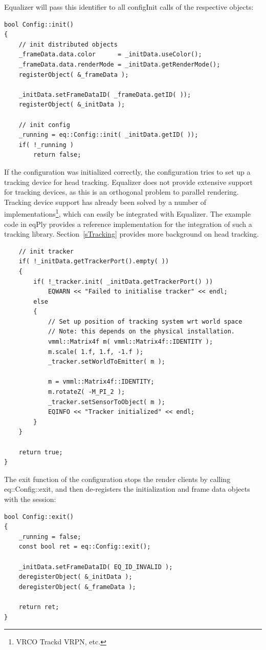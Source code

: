 \documentclass[10pt,a4]{scrartcl}
\newcommand{\sref}[1]{Section~\ref{#1}}
\begin{document}
Equalizer will pass this identifier to all \textsf{configInit} calls of
the respective objects:

{\footnotesize\begin{lstlisting}
bool Config::init()
{
    // init distributed objects
    _frameData.data.color      = _initData.useColor();
    _frameData.data.renderMode = _initData.getRenderMode();
    registerObject( &_frameData );

    _initData.setFrameDataID( _frameData.getID( ));
    registerObject( &_initData );

    // init config
    _running = eq::Config::init( _initData.getID( ));
    if( !_running )
        return false;
\end{lstlisting}}

If the configuration was initialized correctly, the configuration tries
to set up a tracking device for head tracking. Equalizer does not
provide extensive support for tracking devices, as this is an orthogonal
problem to parallel rendering. Tracking device support has already been
solved by a number of implementations\footnote{VRCO Trackd VRPN, etc.},
which can easily be integrated with Equalizer. The example code in
\textsf{eqPly} provides a reference implementation for the integration
of such a tracking library. \sref{sTracking} provides more background on
head tracking.

{\footnotesize\begin{lstlisting}
    // init tracker
    if( !_initData.getTrackerPort().empty( ))
    {
        if( !_tracker.init( _initData.getTrackerPort() ))
            EQWARN << "Failed to initialise tracker" << endl;
        else
        {
            // Set up position of tracking system wrt world space
            // Note: this depends on the physical installation.
            vmml::Matrix4f m( vmml::Matrix4f::IDENTITY );
            m.scale( 1.f, 1.f, -1.f );
            _tracker.setWorldToEmitter( m );

            m = vmml::Matrix4f::IDENTITY;
            m.rotateZ( -M_PI_2 );
            _tracker.setSensorToObject( m );
            EQINFO << "Tracker initialized" << endl;
        }
    }

    return true;
}
\end{lstlisting}}%

The exit function of the configuration stops the render clients by calling
\textsf{eq::Con\-fig::exit}, and then de-registers the initialization and
frame data objects with the session:

{\footnotesize\begin{lstlisting}
bool Config::exit()
{
    _running = false;
    const bool ret = eq::Config::exit();

    _initData.setFrameDataID( EQ_ID_INVALID );
    deregisterObject( &_initData );
    deregisterObject( &_frameData );

    return ret;
}
\end{lstlisting}}
\end{document}
